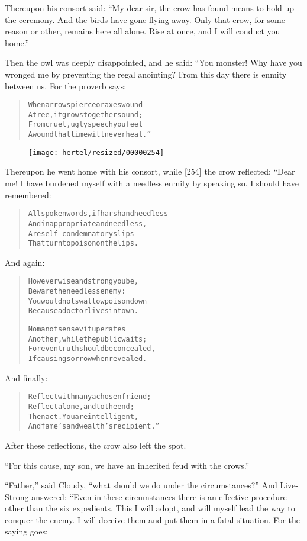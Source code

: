 \documentclass[article, twoside, 10pt]{memoir}
\renewenvironment{verbatim}{%
\begin{quote}%
\vskip -10pt%
\begin{alltt}\normalfont\small}{\end{alltt}%
\end{quote}%
\vskip -10pt
} %
\begin{document}
Thereupon his consort said:
``My dear sir, the crow has found means to hold up the ceremony. And the birds have gone flying away. Only that crow, for some reason or other, remains here all alone. Rise at once, and I will conduct you home.''

Then the owl was deeply disappointed, and he said: “You monster!
Why have you wronged me by preventing the regal anointing? From
this day there is enmity between us. For the proverb says:

\begin{verbatim}
When arrows pierce or axes wound
A tree, it grows together sound;
From cruel, ugly speech you feel
A wound that time will never heal.”
\end{verbatim}
\begin{figure}[p]\texttt{[image: hertel/resized/00000254]}\end{figure}Thereupon he went home with his consort, while [254] the crow
reflected: “Dear me! I have burdened myself with a needless enmity
by speaking so. I should have remembered:

\begin{verbatim}
All spoken words, if harsh and heedless
And inappropriate and needless,
Are self-condemnatory slips
That turn to poison on the lips.
\end{verbatim}
And again:

\begin{verbatim}
However wise and strong you be,
Beware the needless enemy:
You would not swallow poison down
Because a doctor lives in town.

No man of sense vituperates
Another, while the public waits;
For even truth should be concealed,
If causing sorrow when revealed.
\end{verbatim}
And finally:

\begin{verbatim}
Reflect with many a chosen friend;
Reflect alone, and to the end;
Then act. You are intelligent,
And fame's and wealth's recipient.”
\end{verbatim}
After these reflections, the crow also left the spot.

``For this cause, my son, we have an inherited feud with the crows.''

``Father,'' said Cloudy,
``what should we do under the circumstances?'' And Live-Strong
answered: “Even in these circumstances there is an effective
procedure other than the six expedients. This I will adopt, and
will myself lead the way to conquer the enemy. I will deceive them
and put them in a fatal situation. For the saying goes:
\end{document}
